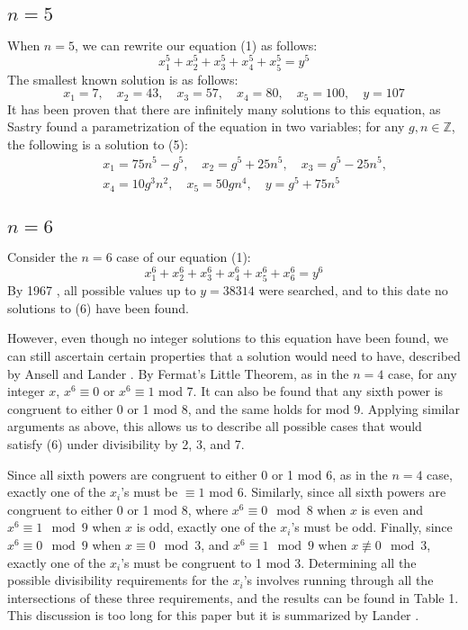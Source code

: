 \documentclass{article}
\newcommand{\q}{\quad}
\begin{document}
\begin{flushleft}
\subsection{$n=5$}
When $n=5$, we can rewrite our equation (1) as follows:
\begin{equation}
    x_1^5 + x_2^5 + x_3^5 +x_4^5 + x_5^5 = y^5
\end{equation}
The smallest known solution \cite{sastry} is as follows:
\begin{equation*}
    x_1=7, \quad x_2=43, \quad x_3= 57, \quad x_4= 80, \quad x_5=100, \quad y=107
\end{equation*}
It has been proven that there are infinitely many solutions to this equation, as Sastry \cite{sastry} found a parametrization of the equation in two variables; for any $g, n \in \mathbb{Z}$, the following is a solution to (5):
\begin{align*}
    &x_1=75n^5-g^5, \q x_2 = g^5 + 25n^5, \q x_3 = g^5 - 25n^5, \\ 
    \q &x_4 = 10g^3n^2, \q x_5 = 50gn^4, \q y=g^5+75n^5 
\end{align*}

\subsection{$n=6$}
Consider the $n=6$ case of our equation (1):
\begin{equation}
    x_1^6 + x_2^6 + x_3^6 +x_4^6 + x_5^6 + x_6^6 = y^6
\end{equation}
By 1967 \cite{lander}, all possible values up to $y=38314$ were searched, and to this date no solutions to (6) have been found. \vspace{.1in}

However, even though no integer solutions to this equation have been found, we can still ascertain certain properties that a solution would need to have, described by Ansell \cite{ansell} and Lander \cite{lander}. By Fermat's Little Theorem, as in the $n=4$ case, for any integer $x$, $x^6 \equiv 0 $ or $x^6 \equiv 1 $ mod 7. It can also be found that any sixth power is congruent to either 0 or 1 mod 8, and the same holds for mod 9. Applying similar arguments as above, this allows us to describe all possible cases that would satisfy (6) under divisibility by 2, 3, and 7. \vspace{.1in}

Since all sixth powers are congruent to either 0 or 1 mod 6, as in the $n=4$ case, exactly one of the $x_i$'s must be $\equiv 1 $ mod 6. Similarly, since all sixth powers are congruent to either 0 or 1 mod 8, where $x^6 \equiv 0 \mod 8$ when $x$ is even and $x^6 \equiv 1\mod 9$ when $x$ is odd, exactly one of the $x_i$'s must be odd. Finally, since $x^6 \equiv 0 \mod 9$ when $x \equiv 0 \mod 3$, and $x^6 \equiv 1 \mod 9$ when $x \not\equiv 0 \mod 3$, exactly one of the $x_i$'s must be congruent to 1 mod 3. Determining all the possible divisibility requirements for the $x_i$'s involves running through all the intersections of these three requirements, and the results can be found in Table 1. This discussion is too long for this paper but it is summarized by Lander \cite{lander}. 


\end{flushleft}
\end{document}
